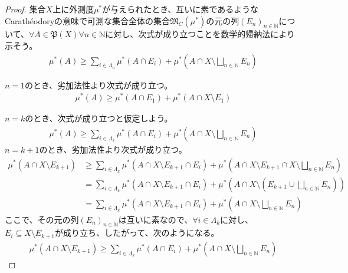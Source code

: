 \documentclass[dvipdfmx]{jsarticle}
\begin{document}
\begin{proof}
集合$X$上に外測度$\mu^{*}$が与えられたとき、互いに素であるようなCarathéodoryの意味で可測な集合全体の集合$\mathfrak{M}_{C}\left( \mu^{*} \right)$の元の列$\left( E_{n} \right)_{n \in \mathbb{N}}$について、$\forall A \in \mathfrak{P}(X)\forall n \in \mathbb{N}$に対し、次式が成り立つことを数学的帰納法により示そう。
\begin{align*}
\mu^{*}(A) \geq \sum_{i \in \varLambda_{n}} {\mu^{*}\left( A \cap E_{i} \right)} + \mu^{*}\left( A \cap X \setminus \bigsqcup_{n \in \mathbb{N}} E_{n} \right)
\end{align*}\par
$n = 1$のとき、劣加法性より次式が成り立つ。
\begin{align*}
\mu^{*}(A) \geq \mu^{*}\left( A \cap E_{1} \right) + \mu^{*}\left( A \cap X \setminus E_{1} \right)
\end{align*}\par
$n = k$のとき、次式が成り立つと仮定しよう。
\begin{align*}
\mu^{*}(A) \geq \sum_{i \in \varLambda_{k}} {\mu^{*}\left( A \cap E_{i} \right)} + \mu^{*}\left( A \cap X \setminus \bigsqcup_{n \in \mathbb{N}} E_{n} \right)
\end{align*}
$n = k + 1$のとき、劣加法性より次式が成り立つ。
\begin{align*}
\mu^{*}\left( A \cap X \setminus E_{k + 1} \right) &\geq \sum_{i \in \varLambda_{k}} {\mu^{*}\left( A \cap X \setminus E_{k + 1} \cap E_{i} \right)} + \mu^{*}\left( A \cap X \setminus E_{k + 1} \cap X \setminus \bigsqcup_{n \in \mathbb{N}} E_{n} \right)\\
&= \sum_{i \in \varLambda_{k}} {\mu^{*}\left( A \cap X \setminus E_{k + 1} \cap E_{i} \right)} + \mu^{*}\left( A \cap X \setminus \left( E_{k + 1} \cup \bigsqcup_{n \in \mathbb{N}} E_{n} \right) \right)\\
&= \sum_{i \in \varLambda_{k}} {\mu^{*}\left( A \cap X \setminus E_{k + 1} \cap E_{i} \right)} + \mu^{*}\left( A \cap X \setminus \bigsqcup_{n \in \mathbb{N}} E_{n} \right)
\end{align*}
ここで、その元の列$\left( E_{n} \right)_{n \in \mathbb{N}}$は互いに素なので、$\forall i \in \varLambda_{k}$に対し、$E_{i} \subseteq X \setminus E_{k + 1}$が成り立ち、したがって、次のようになる。
\begin{align*}
\mu^{*}\left( A \cap X \setminus E_{k + 1} \right) \geq \sum_{i \in \varLambda_{k}} {\mu^{*}\left( A \cap E_{i} \right)} + \mu^{*}\left( A \cap X \setminus \bigsqcup_{n \in \mathbb{N}} E_{n} \right)

\end{align*}
\end{proof}
\end{document}
